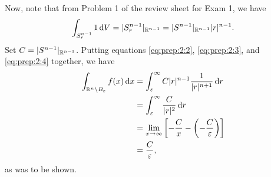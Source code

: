 \begin{solution}
Now, note that from Problem 1 of the review sheet for Exam 1, we have
\begin{equation}
  \label{eq:prep:2:4}
\int_{S_r^{n-1}}1\mathop{}\!\mathrm{d} V=|S_r^{n-1}|_{\mathbb{R}^{n-1}}=|S^{n-1}|_{\mathbb{R}^{n-1}}|r|^{n-1}.
\end{equation}
Set $C=|S^{n-1}|_{\mathbb{R}^{n-1}}$. Putting equations
\eqref{eq:prep:2:2}, \eqref{eq:prep:2:3}, and \eqref{eq:prep:2:4} together,
we have
\begin{equation}
\label{eq:prep:2:5}
\begin{aligned}
\int_{\mathbb{R}^n\setminus B_\varepsilon}f( x )\mathop{}\!\mathrm{d} x
&=\int_\varepsilon^\infty C|r|^{n-1}\frac{1}{|r|^{n+1}}\mathop{}\!\mathrm{d} r\\
&=\int_\varepsilon^\infty\frac{C}{|r|^2}\mathop{}\!\mathrm{d} r\\
&=\lim_{x\to\infty}\left[-\frac{C}{x}-\left(-\frac{C}{\varepsilon}\right)\right]\\
&=\frac{C}{\varepsilon},
\end{aligned}
\end{equation}
as was to be shown.
\end{solution}

